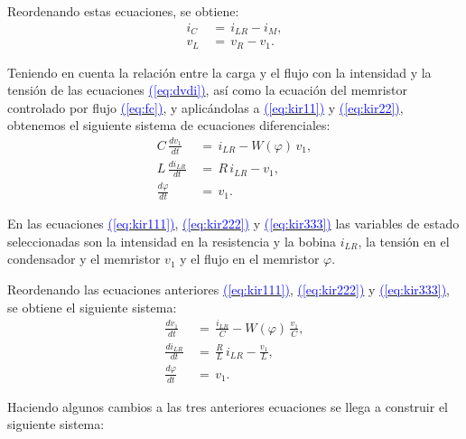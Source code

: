\documentclass[12pt,a4paper]{report} %
\newcommand{\eref}[1]{\hyperref[#1]{\textcolor{blue}{(\ref*{#1})}}}
\newcommand{\eref}[1]{\hyperref[#1]{\textcolor{blue}{\textit{(\ref*{#1})}}}}
\begin{document}
	\noindent Reordenando estas ecuaciones, se obtiene:
	\begin{subequations}
		\label{kir2}
		\begin{align}
		i_C\,&=\,i_{LR}-i_M, \label{eq:kir11}\\[5mm]
		v_L\,&=\,v_R-v_1. \label{eq:kir22}
		\end{align}
	\end{subequations}\smallskip
	
	\noindent Teniendo en cuenta la relación entre la carga y el flujo con la intensidad y la tensión de las ecuaciones \eref{eq:dvdi}, así como la ecuación del memristor controlado por flujo \eref{eq:fc}, y aplicándolas a \eref{eq:kir11} y \eref{eq:kir22}, obtenemos el siguiente sistema de ecuaciones diferenciales:
	\begin{subequations}
		\label{kirr}
		\begin{align}
		C\,\frac{dv_1}{dt}\,&=\,i_{LR}-W(\varphi)\,v_1, \label{eq:kir111}\\[2mm]
		L\,\frac{di_{LR}}{dt}\,&=\,R\,i_{LR}-v_1, \label{eq:kir222}\\[2mm]
		\frac{d\varphi}{dt}\,&=\,v_1. \label{eq:kir333}
	\end{align}
	\end{subequations}\smallskip
	
	\newpage
	
	En las ecuaciones \eref{eq:kir111}, \eref{eq:kir222} y \eref{eq:kir333} las variables de estado seleccionadas son la intensidad en la resistencia y la bobina $i_{LR}$, la tensión en el condensador y el memristor $v_1$ y el flujo en el memristor $\varphi$.
	
	\vspace{0.5cm}\noindent Reordenando las ecuaciones anteriores \eref{eq:kir111}, \eref{eq:kir222} y \eref{eq:kir333}, se obtiene el siguiente sistema:
	\begin{subequations}
	\label{siss}
	\begin{align}
		\frac{dv_1}{dt}\,&=\,\frac{i_{LR}}{C}-W(\varphi)\,\frac{v_1}{C} \label{eq:sis1}, \\[2mm]
		\frac{di_{LR}}{dt}\,&=\,\frac{R}{L}\,i_{LR}-\frac{v_1}{L} \label{eq:sis2}, \\[2mm]
		\frac{d\varphi}{dt}\,&=\,v_1. \label{eq:sis3}
	\end{align}
	\end{subequations}\smallskip
	
	\noindent Haciendo algunos cambios a las tres anteriores ecuaciones se llega a construir el siguiente sistema:
    
\end{document}
